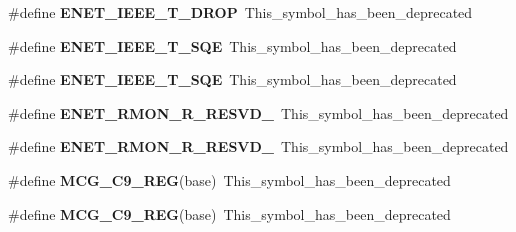 \begin{DoxyCompactItemize}
\item 
\#define {\bfseries E\+N\+E\+T\+\_\+\+I\+E\+E\+E\+\_\+\+T\+\_\+\+D\+R\+OP}~This\+\_\+symbol\+\_\+has\+\_\+been\+\_\+deprecated\hypertarget{group__Backward__Compatibility__Symbols_ga8ae049d1d1c7c61611a6f6ddcf760e96}{}\label{group__Backward__Compatibility__Symbols_ga8ae049d1d1c7c61611a6f6ddcf760e96}

\item 
\#define {\bfseries E\+N\+E\+T\+\_\+\+I\+E\+E\+E\+\_\+\+T\+\_\+\+S\+QE}~This\+\_\+symbol\+\_\+has\+\_\+been\+\_\+deprecated\hypertarget{group__Backward__Compatibility__Symbols_ga8129e9ea49a92cf4297418a1be2bcbc0}{}\label{group__Backward__Compatibility__Symbols_ga8129e9ea49a92cf4297418a1be2bcbc0}

\item 
\#define {\bfseries E\+N\+E\+T\+\_\+\+I\+E\+E\+E\+\_\+\+T\+\_\+\+S\+QE}~This\+\_\+symbol\+\_\+has\+\_\+been\+\_\+deprecated\hypertarget{group__Backward__Compatibility__Symbols_ga8129e9ea49a92cf4297418a1be2bcbc0}{}\label{group__Backward__Compatibility__Symbols_ga8129e9ea49a92cf4297418a1be2bcbc0}

\item 
\#define {\bfseries E\+N\+E\+T\+\_\+\+R\+M\+O\+N\+\_\+\+R\+\_\+\+R\+E\+S\+V\+D\+\_}~This\+\_\+symbol\+\_\+has\+\_\+been\+\_\+deprecated\hypertarget{group__Backward__Compatibility__Symbols_ga0b266930d57561032880164a69b9f7b1}{}\label{group__Backward__Compatibility__Symbols_ga0b266930d57561032880164a69b9f7b1}

\item 
\#define {\bfseries E\+N\+E\+T\+\_\+\+R\+M\+O\+N\+\_\+\+R\+\_\+\+R\+E\+S\+V\+D\+\_}~This\+\_\+symbol\+\_\+has\+\_\+been\+\_\+deprecated\hypertarget{group__Backward__Compatibility__Symbols_ga0b266930d57561032880164a69b9f7b1}{}\label{group__Backward__Compatibility__Symbols_ga0b266930d57561032880164a69b9f7b1}

\item 
\#define {\bfseries M\+C\+G\+\_\+\+C9\+\_\+\+R\+EG}(base)~This\+\_\+symbol\+\_\+has\+\_\+been\+\_\+deprecated\hypertarget{group__Backward__Compatibility__Symbols_ga4edaa0cc446f810f9aa01a41f6960573}{}\label{group__Backward__Compatibility__Symbols_ga4edaa0cc446f810f9aa01a41f6960573}

\item 
\#define {\bfseries M\+C\+G\+\_\+\+C9\+\_\+\+R\+EG}(base)~This\+\_\+symbol\+\_\+has\+\_\+been\+\_\+deprecated\hypertarget{group__Backward__Compatibility__Symbols_ga4edaa0cc446f810f9aa01a41f6960573}{}\label{group__Backward__Compatibility__Symbols_ga4edaa0cc446f810f9aa01a41f6960573}


\end{DoxyCompactItemize}
